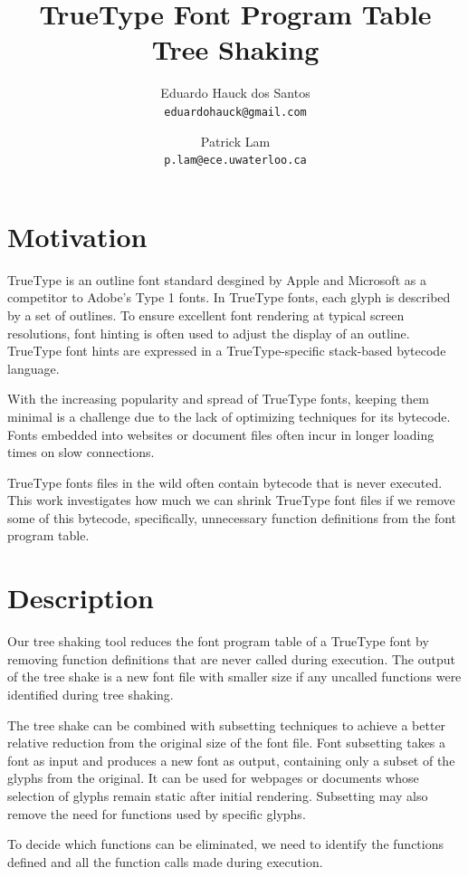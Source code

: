 \documentclass[12pt]{article}
\title{TrueType Font Program Table Tree Shaking}
\author{
  Eduardo Hauck dos Santos\\
  \texttt{eduardohauck@gmail.com}
  \and
  Patrick Lam\\
  \texttt{p.lam@ece.uwaterloo.ca}
}
\begin{document}
\maketitle

\section{Motivation}
TrueType is an outline font standard desgined by Apple and Microsoft as
a competitor to Adobe's Type 1 fonts. In TrueType fonts, each glyph is
described by a set of outlines. To ensure excellent font rendering at typical
screen resolutions, font hinting is often used to adjust the display of
an outline. TrueType font hints are expressed in a TrueType-specific
stack-based bytecode language.

With the increasing popularity and spread of TrueType fonts, keeping
them  minimal is a challenge due to the lack of optimizing techniques
for its bytecode. Fonts embedded into websites or document files often
incur in longer loading times on slow connections.

TrueType fonts files in the wild often contain bytecode that is never
executed. This work investigates how much we can shrink TrueType font
files if we remove some of this bytecode, specifically, unnecessary
function definitions from the font program table.

\section{Description}

Our tree shaking tool reduces the font program table of a
TrueType font by removing function definitions that are never called
during execution. The output of the tree shake is a new font file with
smaller size if any uncalled functions were identified during tree shaking.

The tree shake can be combined with subsetting techniques to achieve a
better relative reduction from the original size of the font file. Font
subsetting takes a font as input and produces a new font as output,
containing only a subset of the glyphs from the original. It can be used
for webpages or documents whose selection of glyphs remain static after
initial rendering. Subsetting may also remove the need for functions
used by specific glyphs.

To decide which functions can be eliminated, we need to identify the
functions defined and all the function calls made during execution.
\end{document}

